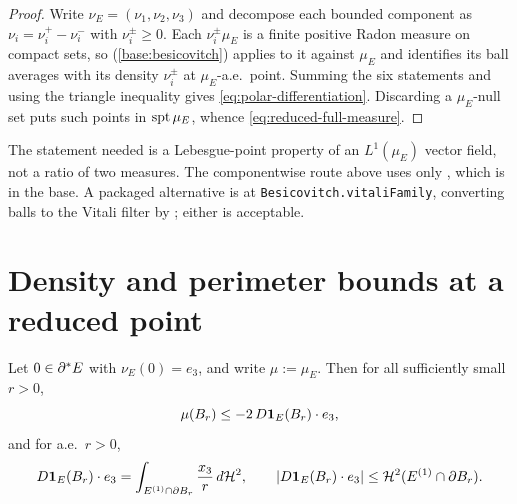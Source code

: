 \begin{proof}
Write $\nu_E=(\nu_1,\nu_2,\nu_3)$ and decompose each bounded component as
$\nu_i=\nu_i^+-\nu_i^-$ with $\nu_i^\pm\ge0$.  Each $\nu_i^\pm\mu_E$ is a
finite positive Radon measure on compact sets, so
 (\ref{base:besicovitch}) applies to
it against $\mu_E$ and identifies its ball averages with its density
$\nu_i^\pm$ at $\mu_E$-a.e.\ point.  Summing the six statements and using the
triangle inequality gives \eqref{eq:polar-differentiation}.  Discarding a
$\mu_E$-null set puts such points in $\operatorname{spt}\mu_E$, whence
\eqref{eq:reduced-full-measure}.
\end{proof}

\begin{fnote}\label{fnote:polar-decl}
The statement needed is a Lebesgue-point property of an $L^1(\mu_E)$ vector
field, not a ratio of two measures.  The componentwise route above uses only
, which is in the base.  A packaged
alternative is
 at
\texttt{Besicovitch.vitaliFamily}, converting balls to the Vitali filter by
; either is acceptable.
\end{fnote}

\section{Density and perimeter bounds at a reduced point}

\begin{lemma}\label{lem:normal-flux}
Let $0\in\partial^* E$ with $\nu_E(0)=e_3$, and write $\mu:=\mu_E$.  Then for all
sufficiently small $r>0$,
\begin{equation}\label{eq:normal-flux-1}
  \mu(B_r)\le-2\,D\mathbf 1_{E}(B_r)\cdot e_3 ,
\end{equation}
and for a.e.\ $r>0$,
\begin{equation}\label{eq:normal-flux-2}
  D\mathbf 1_{E}(B_r)\cdot e_3
  =\int_{E^{(1)}\cap\partial B_r}\frac{x_3}{r}\,d\mathcal H^2,
  \qquad
  |D\mathbf 1_{E}(B_r)\cdot e_3|
  \le\mathcal H^2(E^{(1)}\cap\partial B_r).
\end{equation}
\end{lemma}

